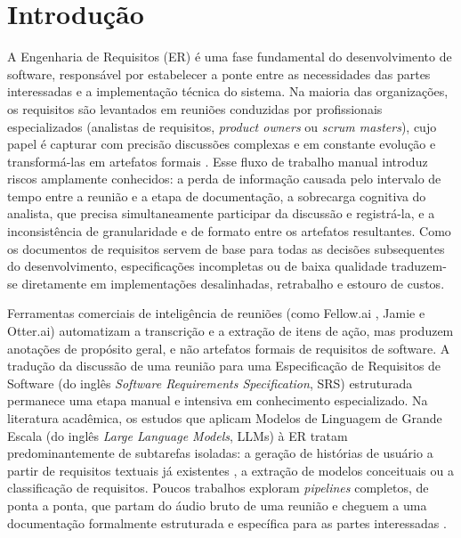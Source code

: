
\chapter{Introdução}
\label{cap:introducao}

A Engenharia de Requisitos (ER) é uma fase fundamental do desenvolvimento de software, responsável por estabelecer a ponte entre as necessidades das partes interessadas e a implementação técnica do sistema. Na maioria das organizações, os requisitos são levantados em reuniões conduzidas por profissionais especializados (analistas de requisitos, \textit{product owners} ou \textit{scrum masters}), cujo papel é capturar com precisão discussões complexas e em constante evolução e transformá-las em artefatos formais \cite{bokhari2011metrics}. Esse fluxo de trabalho manual introduz riscos amplamente conhecidos: a perda de informação causada pelo intervalo de tempo entre a reunião e a etapa de documentação, a sobrecarga cognitiva do analista, que precisa simultaneamente participar da discussão e registrá-la, e a inconsistência de granularidade e de formato entre os artefatos resultantes. Como os documentos de requisitos servem de base para todas as decisões subsequentes do desenvolvimento, especificações incompletas ou de baixa qualidade traduzem-se diretamente em implementações desalinhadas, retrabalho e estouro de custos.

Ferramentas comerciais de inteligência de reuniões (como Fellow.ai \cite{fellow2025}, Jamie \cite{jamie2025} e Otter.ai) automatizam a transcrição e a extração de itens de ação, mas produzem anotações de propósito geral, e não artefatos formais de requisitos de software. A tradução da discussão de uma reunião para uma Especificação de Requisitos de Software (do inglês \textit{Software Requirements Specification}, SRS) estruturada permanece uma etapa manual e intensiva em conhecimento especializado. Na literatura acadêmica, os estudos que aplicam Modelos de Linguagem de Grande Escala (do inglês \textit{Large Language Models}, LLMs) à ER tratam predominantemente de subtarefas isoladas: a geração de histórias de usuário a partir de requisitos textuais já existentes \cite{delgado2024aidriven}, a extração de modelos conceituais \cite{ren2024combining} ou a classificação de requisitos. Poucos trabalhos exploram \textit{pipelines} completos, de ponta a ponta, que partam do áudio bruto de uma reunião e cheguem a uma documentação formalmente estruturada e específica para as partes interessadas \cite{motger2025share}.

